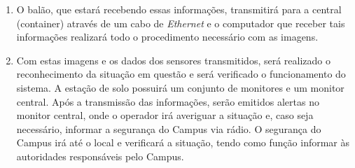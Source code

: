 \begin{enumerate}
	\item O balão, que estará recebendo essas informações, transmitirá para a central (container) através de um cabo de \textit{Ethernet} e o computador que receber tais informações realizará todo o procedimento necessário com as imagens.
	
	\item Com estas imagens e os dados dos sensores transmitidos, será realizado o reconhecimento da situação em questão e será verificado o funcionamento do sistema. A estação de solo possuirá um conjunto de monitores e um monitor central. Após a transmissão das informações, serão emitidos alertas no monitor central, onde o operador irá averiguar a situação e, caso seja necessário, informar a segurança do Campus via rádio. O segurança do Campus irá até o local e verificará a situação, tendo como função informar às autoridades responsáveis pelo Campus.
\end{enumerate}
